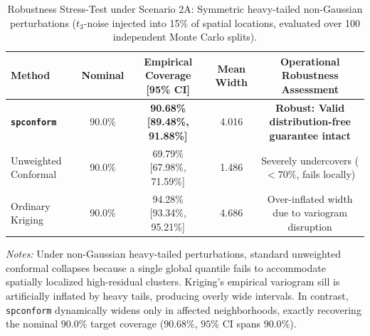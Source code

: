 \documentclass[11pt,a4paper]{article}
\begin{document}
\begin{table}[htbp]
\centering
\small
\begin{threeparttable}
\caption{Robustness Stress-Test under Scenario 2A: Symmetric heavy-tailed non-Gaussian perturbations ($t_3$-noise injected into 15\% of spatial locations, evaluated over 100 independent Monte Carlo splits).}
\label{tab:symmetric_stress_test}
\begin{tabular}{lcccc}
\toprule
\textbf{Method} & \textbf{Nominal} & \textbf{Empirical Coverage [95\% CI]} & \textbf{Mean Width} & \textbf{Operational Robustness Assessment} \\
\midrule
\textbf{\texttt{spconform}} & 90.0\% & \textbf{90.68\% [89.48\%, 91.88\%]} & 4.016 & \textbf{Robust: Valid distribution-free guarantee intact} \\
Unweighted Conformal & 90.0\% & 69.79\% [67.98\%, 71.59\%] & 1.486 & Severely undercovers ($< 70\%$, fails locally) \\
Ordinary Kriging & 90.0\% & 94.28\% [93.34\%, 95.21\%] & 4.686 & Over-inflated width due to variogram disruption \\
\bottomrule
\end{tabular}
\begin{tablenotes}[flushleft]
\footnotesize
\item \textit{Notes:} Under non-Gaussian heavy-tailed perturbations, standard unweighted conformal collapses because a single global quantile fails to accommodate spatially localized high-residual clusters. Kriging's empirical variogram sill is artificially inflated by heavy tails, producing overly wide intervals. In contrast, \texttt{spconform} dynamically widens only in affected neighborhoods, exactly recovering the nominal $90.0\%$ target coverage ($90.68\%$, $95\%$ CI spans $90.0\%$).
\end{tablenotes}
\end{threeparttable}
\end{table}

\vspace{1.5em}
\end{document}
